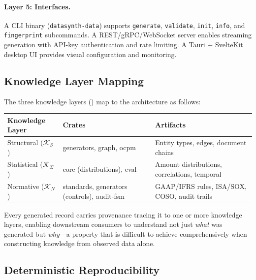 \paragraph{Layer 5: Interfaces.}
A CLI binary (\texttt{datasynth-data}) supports \texttt{generate},
\texttt{validate}, \texttt{init}, \texttt{info}, and \texttt{fingerprint}
subcommands.  A REST/gRPC/WebSocket server enables streaming generation
with API-key authentication and rate limiting.  A Tauri + SvelteKit
desktop UI provides visual configuration and monitoring.

\subsection{Knowledge Layer Mapping}
\label{sec:arch_knowledge_mapping}

The three knowledge layers () map to the
architecture as follows:

\begin{center}
\small
\begin{tabular}{lll}
\toprule
\textbf{Knowledge Layer} & \textbf{Crates} & \textbf{Artifacts} \\
\midrule
Structural ($\mathcal{K}_S$) &
  generators, graph, ocpm &
  Entity types, edges, document chains \\
Statistical ($\mathcal{K}_\Sigma$) &
  core (distributions), eval &
  Amount distributions, correlations, temporal \\
Normative ($\mathcal{K}_N$) &
  standards, generators (controls), audit-fsm &
  GAAP/IFRS rules, ISA/SOX, COSO, audit trails \\
\bottomrule
\end{tabular}
\end{center}

Every generated record carries provenance tracing it to one or more
knowledge layers, enabling downstream consumers to understand not just
\emph{what} was generated but \emph{why}---a property that is difficult to achieve comprehensively when
constructing knowledge from observed data alone.

\subsection{Deterministic Reproducibility}
\label{sec:arch_determinism}

